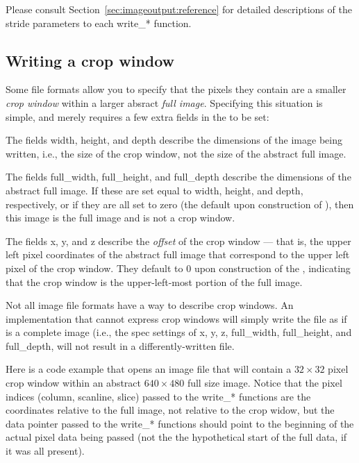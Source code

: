 Please consult Section~\ref{sec:imageoutput:reference} for detailed
descriptions of the stride parameters to each {\cf write_*} function.


\subsection{Writing a crop window}
\label{sec:imageoutput:cropwindows}

Some file formats allow you to specify that the pixels they contain
are a smaller \emph{crop window} within a larger absract \emph{full
  image}.  Specifying this situation is simple, and merely requires
a few extra fields in the \ImageIOFormatSpec to be set:  

The \ImageIOFormatSpec fields {\cf width}, {\cf height}, and {\cf depth}
describe the dimensions of the image being written, i.e., the size of
the crop window, not the size of the abstract full image.

The \ImageIOFormatSpec fields {\cf full_width}, {\cf full_height}, and
{\cf full_depth} describe the dimensions of the abstract full image.  If
these are set equal to {\cf width}, {\cf height}, and {\cf depth},
respectively, or if they are all set to zero (the default upon
construction of \ImageIOFormatSpec), then this image is the full image
and is not a crop window.

The \ImageIOFormatSpec fields {\cf x}, {\cf y}, and {\cf z} describe the
\emph{offset} of the crop window --- that is, the upper left pixel
coordinates of the abstract full image that correspond to the upper left
pixel of the crop window.  They default to 0 upon construction of the
\ImageIOFormatSpec, indicating that the crop window is the
upper-left-most portion of the full image.

Not all image file formats have a way to describe crop windows.
An \ImageOutput implementation that cannot express crop windows will
simply write the file as if is a complete image (i.e., the spec settings
of {\cf x}, {\cf y}, {\cf z}, {\cf full_width}, {\cf full_height}, and
{\cf full_depth}, will not result in a differently-written file.

Here is a code example that opens an image file that will contain a $32
\times 32$ pixel crop window within an abstract $640 \times 480$ full
size image.  Notice that the pixel indices (column, scanline, slice)
passed to the {\cf write_*} functions are the coordinates relative to
the full image, not relative to the crop widow, but the data pointer
passed to the {\cf write_*} functions should point to the beginning of
the actual pixel data being passed (not the the hypothetical start of
the full data, if it was all present).

